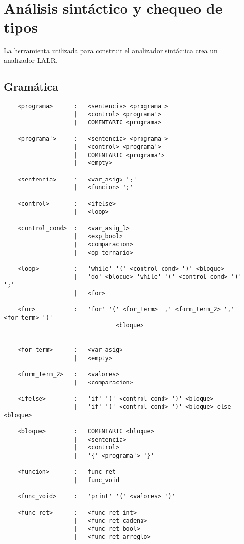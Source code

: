 \section{Análisis sintáctico y chequeo de tipos}

La herramienta utilizada para construir el analizador sintáctica crea un analizador LALR. 
\subsection{Gramática}
\begin{verbatim}
    <programa>      :   <sentencia> <programa'>   
                    |   <control> <programa'>   
                    |   COMENTARIO <programa>   

    <programa'>     :   <sentencia> <programa'>   
                    |   <control> <programa'>   
                    |   COMENTARIO <programa'>   
                    |   <empty>

    <sentencia>     :   <var_asig> ';'
                    |   <funcion> ';'

    <control>       :   <ifelse>
                    |   <loop>

    <control_cond>  :   <var_asig_l>
                    |   <exp_bool>
                    |   <comparacion>
                    |   <op_ternario>

    <loop>          :   'while' '(' <control_cond> ')' <bloque>
                    |   'do' <bloque> 'while' '(' <control_cond> ')' ';' 
                    |   <for>

    <for>           :   'for' '(' <for_term> ',' <form_term_2> ',' <for_term> ')' 
                                <bloque>


    <for_term>      :   <var_asig> 
                    |   <empty>

    <form_term_2>   :   <valores>
                    |   <comparacion>

    <ifelse>        :   'if' '(' <control_cond> ')' <bloque>
                    |   'if' '(' <control_cond> ')' <bloque> else <bloque>

    <bloque>        :   COMENTARIO <bloque>
                    |   <sentencia>
                    |   <control>
                    |   '{' <programa'> '}'

    <funcion>       :   func_ret
                    |   func_void

    <func_void>     :   'print' '(' <valores> ')'

    <func_ret>      :   <func_ret_int>
                    |   <func_ret_cadena>
                    |   <func_ret_bool>
                    |   <func_ret_arreglo>


\end{verbatim}
